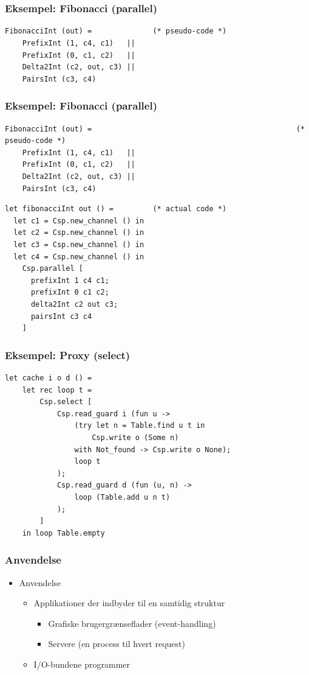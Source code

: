 \documentclass{beamer}
\begin{document}
\section[Eksempler]{}
\begin{frame}[fragile]
  \frametitle{Eksempel: Fibonacci (parallel)}
\begin{verbatim}
FibonacciInt (out) =              (* pseudo-code *)
    PrefixInt (1, c4, c1)   ||
    PrefixInt (0, c1, c2)   ||
    Delta2Int (c2, out, c3) ||
    PairsInt (c3, c4)
\end{verbatim}
\end{frame}
\begin{frame}[fragile]
  \frametitle{Eksempel: Fibonacci (parallel)}
{\tiny
\begin{verbatim}
FibonacciInt (out) =                                               (* pseudo-code *)
    PrefixInt (1, c4, c1)   ||
    PrefixInt (0, c1, c2)   ||
    Delta2Int (c2, out, c3) ||
    PairsInt (c3, c4)
\end{verbatim}
}
\begin{verbatim}
let fibonacciInt out () =         (* actual code *)
  let c1 = Csp.new_channel () in
  let c2 = Csp.new_channel () in
  let c3 = Csp.new_channel () in
  let c4 = Csp.new_channel () in
    Csp.parallel [
      prefixInt 1 c4 c1;
      prefixInt 0 c1 c2;
      delta2Int c2 out c3;
      pairsInt c3 c4
    ]
\end{verbatim}
\end{frame}
\begin{frame}[fragile]
  \frametitle{Eksempel: Proxy (select)}
\begin{verbatim}
let cache i o d () =
    let rec loop t =
        Csp.select [
            Csp.read_guard i (fun u ->
                (try let n = Table.find u t in
                    Csp.write o (Some n)
                with Not_found -> Csp.write o None);
                loop t
            );
            Csp.read_guard d (fun (u, n) ->
                loop (Table.add u n t)
            );
        ]
    in loop Table.empty
\end{verbatim}
\end{frame}
\begin{frame}[fragile]
  \frametitle{Anvendelse}
  \begin{itemize}
    \item Anvendelse
    \begin{itemize}
      \item Applikationer der indbyder til en samtidig struktur
        \begin{itemize}
          \item Grafiske brugergrænseflader (event-handling)
          \item Servere (en process til hvert request)
        \end{itemize}
      \item I/O-bundene programmer
    \end{itemize}
  \end{itemize}
\end{frame}
\end{document}
